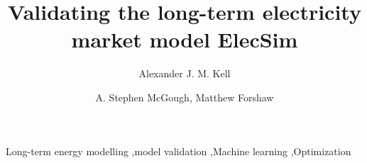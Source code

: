 \documentclass[final,3p,times,twocolumn,numbers]{elsarticle}
\begin{document}
\begin{frontmatter}


 \title{Validating the long-term electricity market model ElecSim}
 \author{Alexander J. M. Kell}



\author{A. Stephen McGough, Matthew Forshaw}

\address{School of Computing, Newcastle University, Newcastle-upon-Tyne, United Kingdom}

\begin{abstract}

\end{abstract}
%
%

\begin{keyword}
Long-term energy modelling \sep model validation \sep Machine learning \sep Optimization


\end{keyword}

\end{frontmatter}
\end{document}
